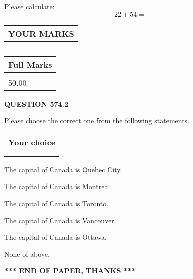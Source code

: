 \documentclass[12pt]{article}
\begin{document}
  
 
Please calculate:
\begin{equation}
22 +  %
54 = \nonumber
\end{equation}
 

 

 
  
\vspace{0.2in}
  
\noindent\begin{tabular}{|l|}
\hline
 YOUR MARKS  \\
\hline
 \\ 
 \\ 
\hline
\end{tabular}
\hspace{0.05in} \begin{tabular}{|l|}
\hline
 Full Marks  \\
\hline
 \\ 
50.00 \\
\hline
\end{tabular}
{\textbf{\Large{QUESTION
574.2 
}}}
  
  
Please choose the correct one from the following statements.
  
  
\noindent\hspace{3.0in} \begin{tabular}{|l|}
\hline
Your choice \\
\hline
 \\ 
 \\ 
\hline
\end{tabular}
  
  
 
 
The capital of Canada is Quebec City.
 
 
The capital of Canada is Montreal.
 
 
The capital of Canada is Toronto.
 
 
The capital of Canada is Vancouver.
 
 
The capital of Canada is Ottawa.
 
 
 None of above.
 
 
   
   
 \vspace{0.2in}
 
   
   
   
   
\vspace{1.0in} 
{\textbf{\large{ *** END OF PAPER, THANKS *** }}} 
   
\end{document}
